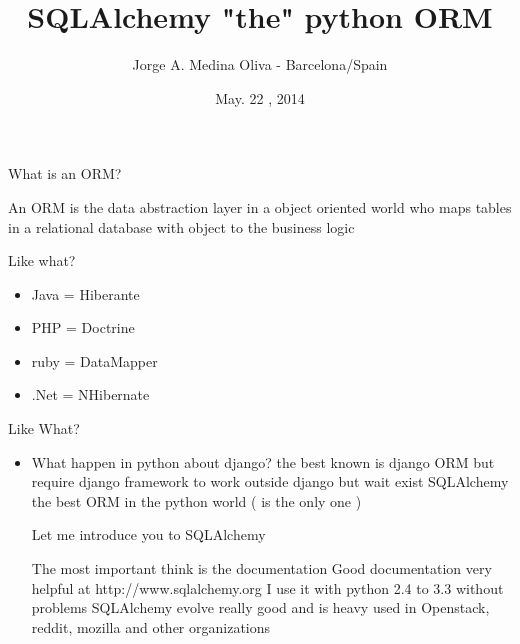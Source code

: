 \documentclass[seagull]{beamer}
\author{Jorge A. Medina Oliva - Barcelona/Spain}
\title{SQLAlchemy "the" python ORM}
\date{May. 22 , 2014}
\begin{document}
\begin{frame}
\titlepage
\end{frame}


\begin{frame}{What is an ORM?}

An ORM is the data abstraction layer in a object oriented world 
who maps tables in a relational database with object to the business logic

\end{frame}

\begin{frame}{Like what?}
\begin{itemize}
	\item Java = Hiberante
	\item PHP = Doctrine
	\item ruby = DataMapper
	\item .Net = NHibernate
\end{itemize}
\end{frame}

\begin{frame}{Like What?}
\begin{itemize}
	\item What happen in python about django?
the best known is django ORM but require django framework to work outside django
but wait exist SQLAlchemy the best ORM in the python world ( is the only one )

Let me introduce you to SQLAlchemy

The most important think is the documentation
Good documentation very helpful at http://www.sqlalchemy.org
I use it with python 2.4 to  3.3 without problems
SQLAlchemy evolve really good and is heavy used in Openstack, reddit, mozilla and other organizations
\end{itemize}
\end{frame}

\begin{frame}
\centering{}
\end{frame}

\end{document}
